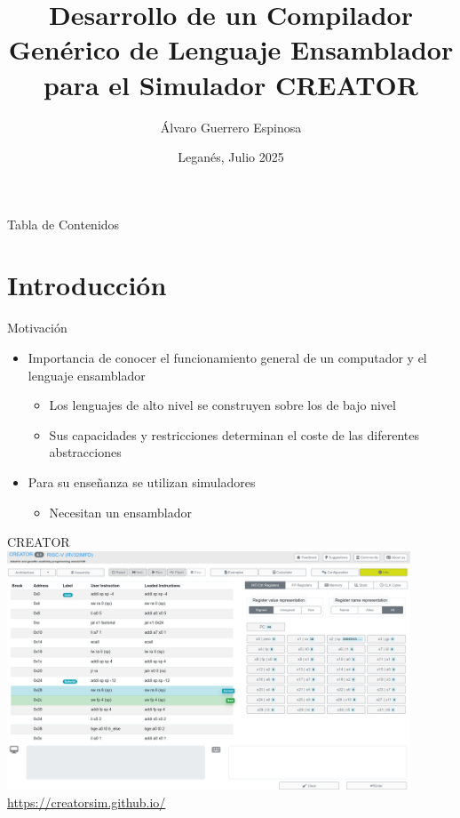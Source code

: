 \documentclass{beamer}
\title[Desarrollo de un Compilador de Ensamblador]{Desarrollo de un Compilador Genérico de Lenguaje Ensamblador para el Simulador CREATOR}
\author{Álvaro Guerrero Espinosa}
\date{Leganés, Julio 2025}
\let\oldurl=\url
\renewcommand{\url}[1]{{\color{blue}\oldurl{#1}}}
\begin{document}
    \frame{\titlepage}

    \begin{frame}{Tabla de Contenidos}
        \tableofcontents
    \end{frame}

    \section{Introducción}

    \begin{frame}{Motivación}
        \begin{itemize}
            \item Importancia de conocer el funcionamiento general de un
            computador y el lenguaje ensamblador
            \begin{itemize}
                \item Los lenguajes de alto nivel se construyen sobre los de
                bajo nivel
                \item Sus capacidades y restricciones determinan el coste de las
                diferentes abstracciones
            \end{itemize}
            \item Para su enseñanza se utilizan simuladores
            \begin{itemize}
                \item Necesitan un ensamblador
            \end{itemize}
        \end{itemize}
    \end{frame}

    \begin{frame}{CREATOR}
        \centering
        \includegraphics[width=0.9\textwidth]{creator}
        \url{https://creatorsim.github.io/}
    \end{frame}
\end{document}
